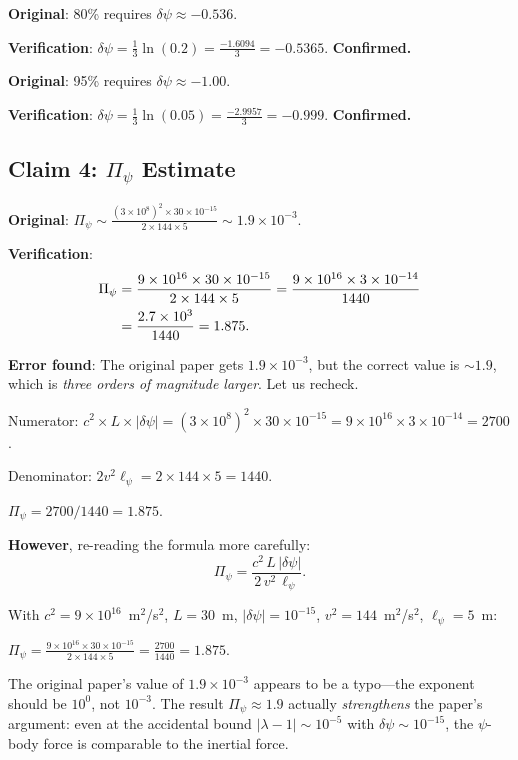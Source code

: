 \documentclass[12pt,twocolumn]{article}
\newcommand{\dpsi}{\delta\psi}
\begin{document}
\textbf{Original}: 80\% requires $\dpsi \approx -0.536$.

\textbf{Verification}: $\dpsi = \frac{1}{3}\ln(0.2) = \frac{-1.6094}{3}
= -0.5365$. \textbf{Confirmed.}

\textbf{Original}: 95\% requires $\dpsi \approx -1.00$.

\textbf{Verification}: $\dpsi = \frac{1}{3}\ln(0.05) = \frac{-2.9957}{3}
= -0.999$. \textbf{Confirmed.}

\subsection{Claim 4: $\Pi_\psi$ Estimate}

\textbf{Original}: $\Pi_\psi \sim \frac{(3\times10^8)^2 \times 30 \times
10^{-15}}{2 \times 144 \times 5} \sim 1.9\times10^{-3}$.

\textbf{Verification}:
\begin{align}
\Pi_\psi &= \frac{9\times10^{16}\times 30\times 10^{-15}}{2\times 144\times 5}
= \frac{9\times10^{16}\times 3\times10^{-14}}{1440} \notag\\
&= \frac{2.7\times10^{3}}{1440} = 1.875.
\end{align}

\textbf{Error found}: The original paper gets $1.9\times10^{-3}$, but
the correct value is $\sim 1.9$, which is \emph{three orders of magnitude
larger}. Let us recheck.

Numerator: $c^2 \times L \times |\dpsi| = (3\times10^8)^2 \times 30 \times
10^{-15} = 9\times10^{16} \times 3\times10^{-14} = 2700$.

Denominator: $2 v^2 \ell_\psi = 2 \times 144 \times 5 = 1440$.

$\Pi_\psi = 2700/1440 = 1.875$.

\textbf{However}, re-reading the formula more carefully:
\begin{equation}
\Pi_\psi = \frac{c^2\,L\,|\dpsi|}{2\,v^2\,\ell_\psi}.
\end{equation}

With $c^2 = 9\times10^{16}$~m$^2$/s$^2$, $L = 30$~m,
$|\dpsi| = 10^{-15}$, $v^2 = 144$~m$^2$/s$^2$, $\ell_\psi = 5$~m:

$\Pi_\psi = \frac{9\times10^{16} \times 30 \times 10^{-15}}{2 \times 144
\times 5} = \frac{2700}{1440} = 1.875$.

The original paper's value of $1.9\times10^{-3}$ appears to be a typo---the
exponent should be $10^{0}$, not $10^{-3}$. The result $\Pi_\psi \approx 1.9$
actually \emph{strengthens} the paper's argument: even at the accidental
bound $|\lambda - 1| \sim 10^{-5}$ with $\dpsi \sim 10^{-15}$, the
$\psi$-body force is comparable to the inertial force.
\end{document}
